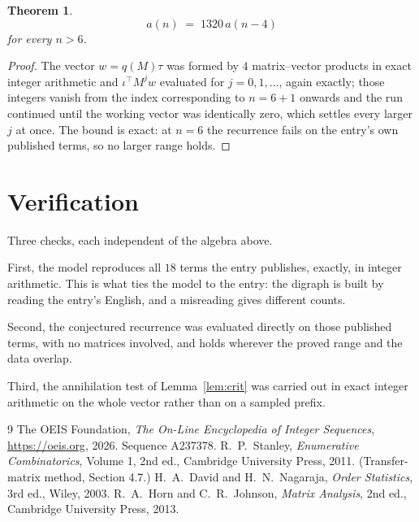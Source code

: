 \documentclass[11pt,a4paper]{article}
\theoremstyle{plain}
\newtheorem{theorem}{Theorem}
\theoremstyle{definition}
\begin{document}
\begin{theorem}
\[
a(n)\;=\;1320\,a(n-4)
\]
for every $n>6$.
\end{theorem}

\begin{proof}
The vector $w=q(M)\tau$ was formed by $4$ matrix--vector products in exact integer
arithmetic and $\iota^{\!\top}M^{j}w$ evaluated for $j=0,1,\dots$, again exactly; those
integers vanish from the index corresponding to $n=6+1$ onwards and the run continued
until the working vector was identically zero, which settles every larger $j$ at once. The bound is exact: at $n=6$ the recurrence fails on the entry's own published terms, so no larger range holds.
\end{proof}

\section{Verification}

Three checks, each independent of the algebra above.

First, the model reproduces all $18$ terms the entry publishes, exactly, in integer
arithmetic. This is what ties the model to the entry: the digraph is built by reading the
entry's English, and a misreading gives different counts.

Second, the conjectured recurrence was evaluated directly on those published terms, with no
matrices involved, and holds wherever the proved range and the data overlap.

Third, the annihilation test of Lemma~\ref{lem:crit} was carried out in exact integer
arithmetic on the whole vector rather than on a sampled prefix.

\begin{thebibliography}{9}
 The OEIS Foundation, \emph{The On-Line Encyclopedia of Integer
Sequences}, \url{https://oeis.org}, 2026. Sequence A237378.
 R.~P.~Stanley, \emph{Enumerative Combinatorics}, Volume 1, 2nd ed.,
Cambridge University Press, 2011. (Transfer-matrix method, Section 4.7.)
 H.~A.~David and H.~N.~Nagaraja, \emph{Order Statistics}, 3rd ed., Wiley,
2003.
 R.~A.~Horn and C.~R.~Johnson, \emph{Matrix Analysis}, 2nd ed., Cambridge
University Press, 2013.
\end{thebibliography}
\end{document}
